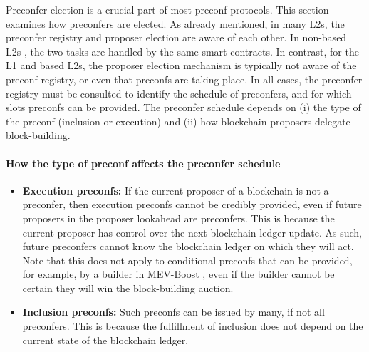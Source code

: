 \documentclass[a4paper]{article}
\theoremstyle{boldstyle}
\newcommand{\todoks}[1]{\todo[color=purple!40]{\textbf{Katerina:} #1}}
\begin{document}
Preconfer election is a crucial part of most preconf protocols.
This section examines how preconfers are elected.
As already mentioned, in many L2s, the preconfer registry and proposer election are aware of each other. In non-based L2s \cite{Optimism,ZKsync,Arbitrum}, the two tasks are handled by the same smart contracts. In contrast, for the L1 and based L2s, the proposer election mechanism is typically not aware of the preconf registry, or even that preconfs are taking place. In all cases, the preconfer registry must be consulted to identify the schedule of preconfers, and for which slots preconfs can be provided.
The preconfer schedule depends on (i) the type of the preconf (inclusion or execution) and (ii) how blockchain proposers delegate block-building. %

\paragraph{How the type of preconf affects the preconfer schedule}

\begin{itemize}
    \item \textbf{Execution preconfs:} If the current proposer of a blockchain is not a preconfer, then execution preconfs cannot be credibly provided, even if future proposers in the proposer lookahead are preconfers. This is because the current proposer has control over the next blockchain ledger update. As such, future preconfers cannot know the blockchain ledger on which they will act. Note that this does not apply to conditional preconfs that can be provided, for example, by a builder in MEV-Boost \cite{MEV-Boost}, even if the builder cannot be certain they will win the block-building auction.
    \item \textbf{Inclusion preconfs:}
     Such preconfs can be issued by many, if not all preconfers. This is because the fulfillment of inclusion does not depend on the current state of the blockchain ledger.  
\end{itemize}
\end{document}
